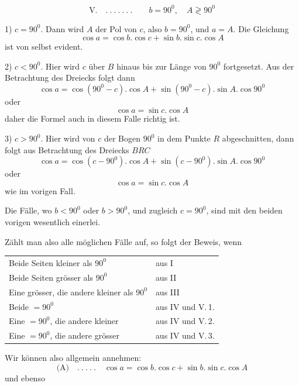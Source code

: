 %
\[
\text{V.}\quad .\ .\ .\ .\ .\ .\ .\qquad b=90^0,\quad A\gtrless90^0
\]
\par
1) \(c=90^0\). Dann wird \(A\) der Pol von \(c\), also \(b=90^0\), und \(a=A\). Die Gleichung
\[
\cos a=\cos b.\cos c+\sin b.\sin c.\cos A
\]
ist von selbst evident.

2) \(c<90^0\). Hier wird \(c\) über \(B\) hinaus bis zur Länge von \(90^0\) fortgesetzt. Aus der Betrachtung des Dreiecks folgt dann
\[
\cos a=\cos(90^0-c).\cos A+\sin(90^0-c).\sin A.\cos90^0
\]
oder
\[
\cos a=\sin c.\cos A
\]
daher die Formel auch in diesem Falle richtig ist.

3) \(c>90^0\). Hier wird von \(c\) der Bogen \(90^0\) in dem Punkte \(R\) abgeschnitten, dann folgt aus Betrachtung des Dreiecks \(BRC\)
\[
\cos a=\cos(c-90^0).\cos A+\sin(c-90^0).\sin A.\cos90^0
\]
oder
\[
\cos a=\sin c.\cos A
\]
wie im vorigen Fall.

Die Fälle, wo \(b<90^0\) oder \(b>90^0\), und zugleich \(c=90^0\), sind mit den beiden vorigen wesentlich einerlei.

Zählt man also alle möglichen Fälle auf, so folgt der Beweis, wenn
\begin{center}
\begin{tabular}{ll}
Beide Seiten kleiner als \(90^0\)&aus I\\
Beide Seiten grösser als \(90^0\)&aus II\\
Eine grösser, die andere kleiner als \(90^0\)&aus III\\
Beide \(=90^0\)&aus IV und V.\,1.\\
Eine \(=90^0\), die andere kleiner&aus IV und V.\,2.\\
Eine \(=90^0\), die andere grösser&aus IV und V.\,3.
\end{tabular}
\end{center}
\hspace*{\parindent}Wir können also allgemein annehmen:
\[
\text{(A)}\quad .\ .\ .\ .\ .\quad\cos a=\cos b.\cos c+\sin b.\sin c.\cos A
\]
und ebenso
